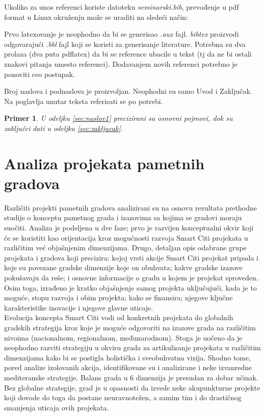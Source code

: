 \documentclass[a4paper,12pt]{article}
\newtheorem{primer}{Primer}[section]
\begin{document}
{Ukoliko za unos referenci koriste datoteku {\em seminarski.bib},  prevođenje u pdf format u Linux okruženju može se uraditi na sledeći način:

Prvo latexovanje je neophodno da bi se generisao {\em .aux} fajl. {\em bibtex} proizvodi odgovarajući {\em .bbl} fajl koji se koristi za generisanje literature. 
Potrebna su dva prolaza (dva puta pdflatex) da bi se reference ubacile u tekst (tj da ne bi ostali znakovi pitanja umesto referenci). Dodavanjem novih referenci potrebno je ponoviti ceo postupak.  


Broj naslova i podnaslova je proizvoljan. Neophodni su samo Uvod i Zaključak. Na poglavlja unutar teksta referisati se po potrebi. 
\begin{primer}
U odeljku \ref{sec:naslov1} precizirani su osnovni pojmovi, dok su zaključci dati u odeljku \ref{sec:zakljucak}.
\end{primer}




\section{Analiza projekata pametnih gradova}
\label{slike_i_tabele}

Različiti projekti pametnih gradova analizirani su na osnovu rezultata prethodne studije o konceptu pametnog grada i izazovima sa kojima se gradovi moraju suočiti. Analiza je podeljena u dve faze; prvo je razvijen konceptualni okvir koji će se koristiti kao orijentacija kroz mogućnosti razvoja Smart Citi projekata u različitim već objašnjenim dimenzijama. Drugo, detaljan opis odabrane grupe projekata i gradova koji precizira: kojoj vrsti akcije Smart Citi projekat pripada i koje su povezane gradske dimenzije koje on obuhvata; kakve gradske izazove pokušavaju da reše; i osnovne informacije o gradu u kojem je projekat sproveden. Osim toga, izrađeno je kratko objašnjenje samog projekta uključujući, kada je to moguće, stopu razvoja i obim projekta; kako se finansira; njegove ključne karakteristike inovacije i njegove glavne uticaje. \\

Evolucija koncepta Smart Citi vodi od konkretnih projekata do globalnih gradskih strategija kroz koje je moguće odgovoriti na izazove grada na različitim nivoima (nacionalnom, regionalnom, međunarodnom). Stoga je uočeno da je neophodno razviti strategiju u okviru grada za artikulisanje projekata u različitim dimenzijama kako bi se postigla holistička i sveobuhvatna vizija. Shodno tome, pored analize izolovanih akcija, identifikovane su i analizirane i neke izvanredne mediteranske strategije. Balans grada u 6 dimenzija je presudan za dobar učinak. Bez globalne strategije, grad je u opasnosti da izvede neke akupunkturne projekte koji dovode do toga da postane neuravnotežen, a samim tim i do drastičnog smanjenja uticaja ovih projekata. \\

}
\end{document}
